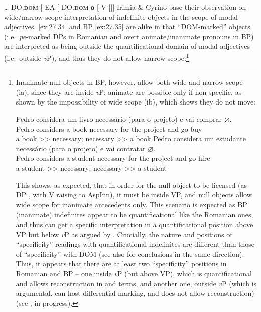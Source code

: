 \documentclass[output=paper]{langsci/langscibook}
\begin{document}
\ea\label{ex:27.33}
    \tss{} \dots{} \gls{DO}.\textbf{\textsc{dom}} [ \gls{EA}
    [ \sout{\gls{DO}.\textbf{\textsc{dom}}} α [ V \sout{} ]]]
\z
Irimia \& Cyrino base their observation on wide/narrow scope interpretation of
indefinite objects in the scope of modal adjectives.  \eqref{ex:27.34} and \gls{BP} \eqref{ex:27.35}
are alike in that ``DOM-marked'' objects (i.e.\ \emph{pe}{}-marked DPs in
Romanian and overt animate/inanimate pronouns in BP)  are interpreted as being
outside the quantificational domain of modal adjectives (i.e.\ outside
\emph{v}P), and thus they do not allow narrow scope:\footnote{Inanimate null
objects in \gls{BP}, however, allow both wide and narrow scope (ia), since they are
inside \emph{v}P; animate  are possible only if non-specific, as shown by
the impossibility of wide scope (ib), which shows they do not move:

\begin{xlist}
        \ea
            \gll    Pedro considera um livro necessário (para o   projeto) e vai comprar \textbf{$\varnothing$}.\\
                    Pedro  considers a    book necessary for   the project  and go buy\\
            \glt    a book >> necessary; necessary >> a book
        \ex
            \gll    Pedro considera um estudante necessário (para o   projeto) e   vai contratar \textbf{$\varnothing$}.\\
                    Pedro considers  a    student necessary    for   the project  and go hire\\
            \glt    *a student >> necessary; necessary >> a student
        \z
\end{xlist}
This shows, as expected, that in order for the null object to be licensed (as
DP , with V raising to AspInn), it must be inside VP, and null
objects allow wide scope for inanimate antecedents only.  This scenario is
expected as \gls{BP} (inanimate) indefinites appear to be quantificational like the
Romanian ones, and thus can get a specific interpretation in a quantificational
position above VP but below \emph{v}P as argued by
\citet{IrimiaCyrino2015,IrimiaCyrino2017}. Crucially, the nature and positions
of \enquote{specificity} readings with quantificational indefinites are
different than those of \enquote{specificity} with DOM (see also \citealt{Lopez2012} for conclusions in the same direction).
Thus, it appears that there are at least two \enquote{specificity} positions in
Romanian and \gls{BP} -- one inside \emph{v}P (but
above VP), which is quantificational and allows reconstruction in
 and  terms, and another one, outside
\emph{v}P (which is argumental, can host differential marking, and does not
allow reconstruction) (see \citealt{IrimiaCyrino2015}, in progress).}\pagebreak
\end{document}
